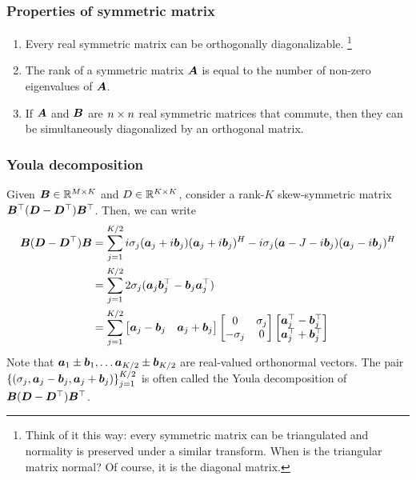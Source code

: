 \documentclass[10pt]{article}
\begin{document}
\subsubsection{Properties of symmetric matrix}
\begin{enumerate}
    \item Every real symmetric matrix can be orthogonally diagonalizable. \footnote{Think of it this way: every symmetric matrix can be triangulated and normality is preserved under a similar transform. When is the triangular matrix normal? Of course, it is the diagonal matrix.} 
    \item  The rank of a symmetric matrix ${\bm{A}}$ is equal to the number of non-zero eigenvalues of ${\bm{A}}$.
    \item If ${\bm{A}}$ and ${\bm{B}}$ are $n \times n$ real symmetric matrices that commute, then they can be simultaneously diagonalized by an orthogonal matrix. 
\end{enumerate}
\subsubsection{Youla decomposition}
Given ${\bm{B}} \in \mathbb{R}^{M \times K}$ and $D \in \mathbb{R}^{K \times K}$, consider a rank-$K$ skew-symmetric matrix ${\bm{B}}^{\top} ({\bm{D}} - {\bm{D}}^{\top}){\bm{B}}^{\top}$. Then, we can write 
\begin{align}
    {\bm{B}}({\bm{D}}- {\bm{D}}^{\top}){\bm{B}} &= \sum_{j=1}^{K/2} i \sigma_j ({\bm{a}}_j + i {\bm{b}}_j) ({\bm{a}}_j + i {\bm{b}}_j)^H - i \sigma_j ({\bm{a}}-J - i {\bm{b}}_j)({\bm{a}}_j - i {\bm{b}}_j)^H \\ 
    &= \sum_{j=1}^{K/2} 2 \sigma_j ( {\bm{a}}_j {\bm{b}}_j^{\top} - {\bm{b}}_j {\bm{a}}_j^{\top}) \\ 
    &= \sum_{j=1}^{K/2} 
    \begin{bmatrix}
        {\bm{a}}_j-{\bm{b}}_j & {\bm{a}}_j + {\bm{b}}_j 
    \end{bmatrix}
    \begin{bmatrix}
        0 & \sigma_j \\ 
        -\sigma_j & 0 
    \end{bmatrix}
    \begin{bmatrix}
        {\bm{a}}_j^{\top} - {\bm{b}}_j^{\top} \\
        {\bm{a}}_j^{\top} + {\bm{b}}_j^{\top} 
    \end{bmatrix}
\end{align}
Note that ${\bm{a}}_1 \pm {\bm{b}}_1, \dots {\bm{a}}_{K/2} \pm {\bm{b}}_{K/2}$ are real-valued orthonormal vectors. The pair $\left\{ (\sigma_j, {\bm{a}}_j - {\bm{b}}_j , {\bm{a}}_j + {\bm{b}}_j) \right\}_{j=1}^{K/2}$ is often called the \alert{Youla decomposition} of ${\bm{B}} ({\bm{D}} - {\bm{D}}^{\top}){\bm{B}}^{\top}$.
\end{document}
